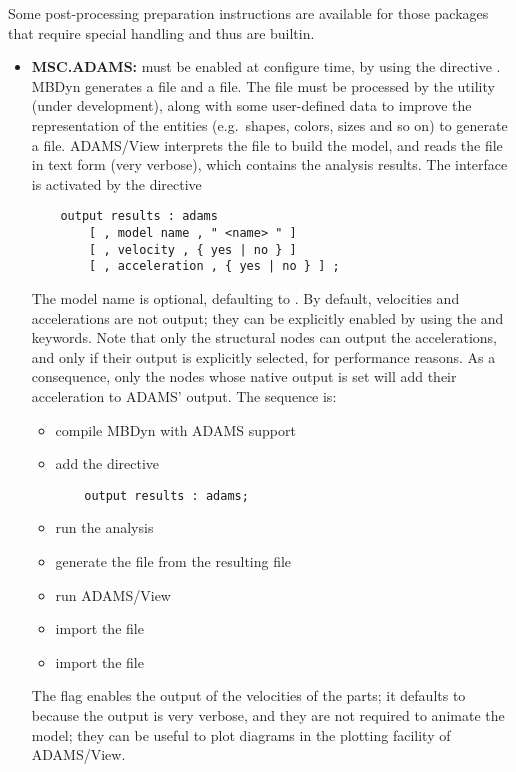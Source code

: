 \noindent
Some post-processing preparation instructions are available
for those packages that require special handling and thus
are builtin.
\begin{itemize}
\item \textbf{MSC.ADAMS:}
must be enabled at configure time, by using the directive
.
MBDyn generates a  file and a  file.
The  file must be processed by the utility  
(under development), along with some user-defined data to improve
the representation of the entities (e.g.\ shapes, colors, sizes
and so on) to generate a  file.
ADAMS/View interprets the  file to build the model,
and reads the  file in text form (very verbose),
which contains the analysis results.
The interface is activated by the directive
\begin{verbatim}
    output results : adams
        [ , model name , " <name> " ]
        [ , velocity , { yes | no } ]
        [ , acceleration , { yes | no } ] ;
\end{verbatim}
The model name is optional, defaulting to .
By default, velocities and accelerations are not output; they can be
explicitly enabled by using the  and 
keywords.
Note that only the  structural nodes can output 
the accelerations, and only if their output is explicitly selected,
for performance reasons.
As a consequence, only the nodes whose native output is set will add 
their acceleration to ADAMS' output.
The sequence is:
\begin{itemize}
\item compile MBDyn with ADAMS support
\item add the directive
\begin{verbatim}
    output results : adams;
\end{verbatim}
\item run the analysis
\item generate the  file from the resulting  file
\item run ADAMS/View
\item import the  file
\item import the  file
\end{itemize}
The  flag enables the output of the velocities 
of the parts; it defaults to  because the output 
is very verbose, and they are not required to animate
the model; they can be useful to plot diagrams in the plotting
facility of ADAMS/View.


\end{itemize}
